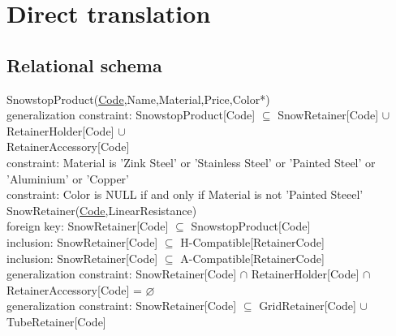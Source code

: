 \section{Direct translation}

\subsection{Relational schema}

\vspace{12px}

{\color{ForestGreen}SnowstopProduct(\underline{Code},Name,Material,Price,Color*)}\\
{\color{Orange}\hspace{2mm} generalization constraint: {\color{Magenta} SnowstopProduct[Code] $\subseteq $ SnowRetainer[Code] $\cup$ RetainerHolder[Code] $\cup$ }} \\
{{\color{Magenta}\hspace{39mm} RetainerAccessory[Code] }} \\
{\color{Orange}\hspace{2mm} constraint: {\color{Magenta}Material is 'Zink Steel' or 'Stainless Steel' or 'Painted Steel' or 'Aluminium' or 'Copper'}} \\
{\color{Orange}\hspace{2mm} constraint: {\color{Magenta}Color is NULL if and only if Material is not 'Painted Steeel'}} \\

{\color{ForestGreen}SnowRetainer(\underline{Code},LinearResistance)}\\
{\color{Orange}\hspace{2mm} foreign key: {\color{Magenta}SnowRetainer[Code] $\subseteq$ SnowstopProduct[Code]}} \\
{\color{Orange}\hspace{2mm} inclusion: {\color{Magenta}SnowRetainer[Code] $\subseteq$ H-Compatible[RetainerCode]}} \\
{\color{Orange}\hspace{2mm} inclusion: {\color{Magenta}SnowRetainer[Code] $\subseteq$ A-Compatible[RetainerCode]}} \\
{\color{Orange}\hspace{2mm} generalization constraint: {\color{Magenta} SnowRetainer[Code] $\cap $ RetainerHolder[Code] $\cap$ RetainerAccessory[Code] = $\varnothing $}} \\
{\color{Orange}\hspace{2mm} generalization constraint: {\color{Magenta} SnowRetainer[Code] $\subseteq $ GridRetainer[Code] $\cup$ TubeRetainer[Code] }} \\



